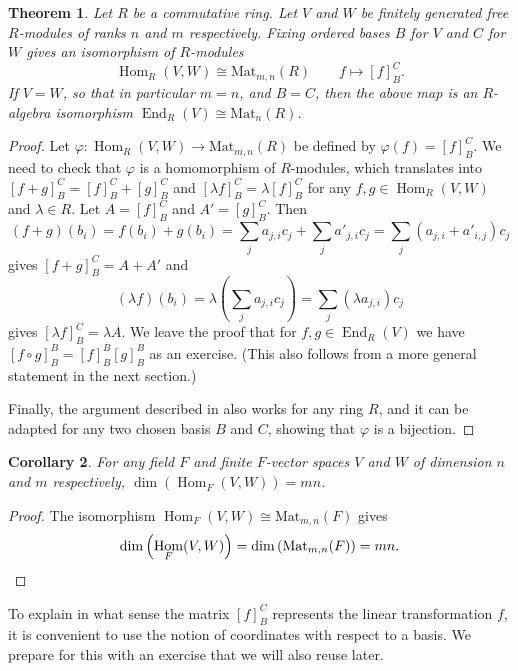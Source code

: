 \documentclass[12pt]{report}
\newtheorem{theorem}{Theorem}[chapter]
\newtheorem{corollary}[theorem]{Corollary}
\numberwithin{equation}{section}
\numberwithin{theorem}{chapter}
\theoremstyle{definition}
\newtheorem*{basic properties}{Basic Properties}
\newtheorem*{Important Remark}{Important Remark}
\DeclareMathOperator{\End}{End}
\DeclareMathOperator{\Hom}{Hom}
\begin{document}
\begin{theorem}
\label{prop:hommat}
Let $R$ be a commutative ring. Let $V$ and $W$ be finitely generated free $R$-modules of ranks $n$ and $m$ respectively. Fixing ordered bases $B$ for $V$ and $C$ for $W$ gives an isomorphism of $R$-modules
$$\Hom_R(V, W) \cong \mathrm{Mat}_{m,n}(R) \qquad f\mapsto [f]_B^C.$$
If $V=W$, so that in particular $m=n$, and $B=C$, then the above map is an $R$-algebra isomorphism $\End_R(V)\cong\mathrm{Mat}_n(R)$.
\end{theorem}
 
\begin{proof}
Let $\varphi\!:\Hom_R(V, W) \to \mathrm{Mat}_{m,n}(R)$ be defined by $\varphi(f)=[f]_B^C$. 
We need to check that $\varphi$ is a homomorphism of $R$-modules, which translates into $[f+g]_B^C=[f]_B^C+[g]_B^C$ and $[\lambda f]_B^C=\lambda[f]_B^C$ for any $f,g \in \Hom_R(V, W)$ and $\lambda\in R$. 
Let $A=[f]_B^C$ and $A'=[g]_B^C$. Then 
$$(f+g)(b_i)=f(b_i)+g(b_i)= \sum_j a_{j,i} c_j+ \sum_j a'_{j,i} c_j= \sum_j (a_{j,i}+a'_{i,j}) c_j$$
gives $[f+g]_B^C=A+A'$ and
$$(\lambda f)(b_i)=\lambda\left( \sum_j a_{j,i} c_j\right)= \sum_j (\lambda a_{j,i}) c_j$$
gives $[\lambda f]_B^C=\lambda A$.
We leave the proof that for $f,g\in \End_R(V)$ we have $[f\circ g]_B^B=[f]_B^B[g]_B^B$ as an exercise. (This also follows from a more general statement in the next section.)

Finally, the argument described in  also works for any ring $R$, and it can be adapted for any two chosen basis $B$ and $C$, showing that $\varphi$ is a bijection.
\end{proof}



\begin{corollary}
For any field $F$ and finite $F$-vector spaces $V$ and $W$ of dimension $n$ and $m$ respectively, $\dim(\Hom_F(V, W))=mn$.
\end{corollary}

\begin{proof}
The isomorphism $\Hom_F(V, W) \cong \mathrm{Mat}_{m,n}(F)$ gives 
$$\dim \left(\Hom_F(V, W) \right) = \dim \left( \mathrm{Mat}_{m,n}(F) \right)=mn.\qedhere$$ 
\end{proof}
 
 
 To explain in what sense the matrix $[f]_B^C$ represents the linear transformation $f$, it is convenient to use the notion of coordinates with respect to a basis. We prepare for this with an exercise that we will also reuse later.
 
\end{document}
